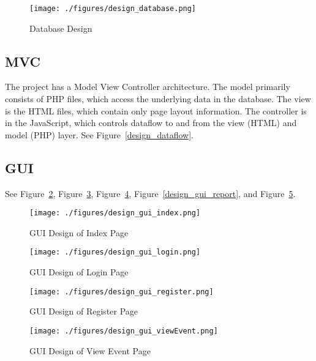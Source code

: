   \begin{figure}[tbh]
\begin{center}
\texttt{[image: ./figures/design\_database.png]}
\end{center}
\caption{Database Design \label{design_database}}
\end{figure}
 
 \subsection{MVC} The project has a Model View Controller architecture. The model primarily consists of PHP files, which access the underlying data in the database. The view is the HTML files, which contain only page layout information. The controller is in the JavaScript, which controls dataflow to and from the view (HTML) and model (PHP) layer. See Figure~\ref{design_dataflow}.
 
 \subsection{GUI} See Figure~\ref{design_gui_index}, Figure~\ref{design_gui_login}, Figure~\ref{design_gui_register}, Figure~\ref{design_gui_report}, and Figure~\ref{design_gui_viewEvent}.
 
 \begin{figure}[!htbp]
\begin{center}
\texttt{[image: ./figures/design\_gui\_index.png]}
\end{center}
\caption{GUI Design of Index Page \label{design_gui_index}}
\end{figure}

 \begin{figure}[!htbp]
\begin{center}
\texttt{[image: ./figures/design\_gui\_login.png]}
\end{center}
\caption{GUI Design of Login Page \label{design_gui_login}}
\end{figure}

 \begin{figure}[!htbp]
\begin{center}
\texttt{[image: ./figures/design\_gui\_register.png]}
\end{center}
\caption{GUI Design of Register Page \label{design_gui_register}}
\end{figure}

\begin{figure}[!htbp]
\begin{center}
\texttt{[image: ./figures/design\_gui\_viewEvent.png]}
\end{center}
\caption{GUI Design of View Event Page \label{design_gui_viewEvent}}
\end{figure}

